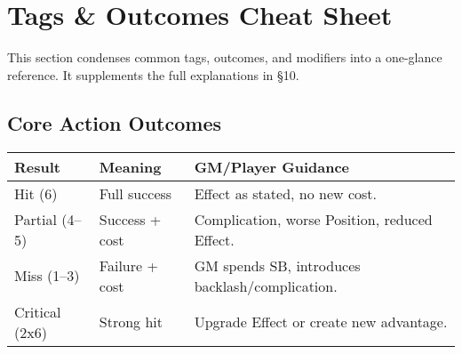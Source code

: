 

\section{Tags \& Outcomes Cheat Sheet}
\label{sec:tags-cheatsheet}

This section condenses common tags, outcomes, and modifiers into a one-glance reference. It supplements the full explanations in \S10.

\setlength{\extrarowheight}{2pt}

\subsection{Core Action Outcomes}
\begin{center}
\begin{tabular}{|p{2.4cm}|p{3.0cm}|p{8.0cm}|}
\hline
\textbf{Result} & \textbf{Meaning} & \textbf{GM/Player Guidance} \\ \hline
Hit (6) & Full success & Effect as stated, no new cost. \\ \hline
Partial (4--5) & Success + cost & Complication, worse Position, reduced Effect. \\ \hline
Miss (1--3) & Failure + cost & GM spends SB, introduces backlash/complication. \\ \hline
Critical (2x6) & Strong hit & Upgrade Effect or create new advantage. \\ \hline
\end{tabular}
\end{center}

